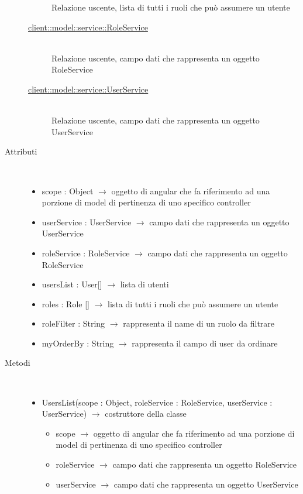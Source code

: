 \begin{description}
\begin{description}
	Relazione uscente, lista di tutti i ruoli che può assumere un utente
	\item[\hyperlink{client::model::service::RoleService}{client::model::service::RoleService}] \hfill \\
	Relazione uscente, campo dati che rappresenta un oggetto RoleService
	\item[\hyperlink{client::model::service::UserService}{client::model::service::UserService}] \hfill \\
	Relazione uscente, campo dati che rappresenta un oggetto UserService
\end{description}

\item[Attributi] \hfill \\
\vspace{-7mm}
\begin{itemize}
	\item scope : Object $\rightarrow$ oggetto di angular che fa riferimento ad una porzione di model di pertinenza di uno specifico controller
	\item userService : UserService $\rightarrow$ campo dati che rappresenta un oggetto UserService
	\item roleService : RoleService $\rightarrow$ campo dati che rappresenta un oggetto RoleService
	\item usersList : User[] $\rightarrow$ lista di utenti
	\item roles : Role [] $\rightarrow$ lista di tutti i ruoli che può assumere un utente
	\item roleFilter : String $\rightarrow$ rappresenta il name di un ruolo da filtrare
	\item myOrderBy : String $\rightarrow$ rappresenta il campo di user da ordinare
\end{itemize}

\item[Metodi] \hfill \\
\vspace{-7mm}
\begin{itemize}
	\item UsersList(scope : Object, roleService : RoleService, userService : UserService) $\rightarrow$ costruttore della classe\begin{itemize}
		\item scope $\rightarrow$ oggetto di angular che fa riferimento ad una porzione di model di pertinenza di uno specifico controller
		\item roleService $\rightarrow$ campo dati che rappresenta un oggetto RoleService
		\item userService $\rightarrow$ campo dati che rappresenta un oggetto UserService
	\end{itemize}
	

\end{itemize}
\end{description}

